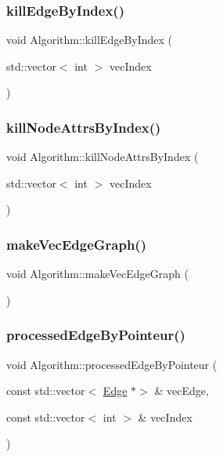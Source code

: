 \subsubsection{\texorpdfstring{kill\+Edge\+By\+Index()}{killEdgeByIndex()}}
{\footnotesize\ttfamily void Algorithm\+::kill\+Edge\+By\+Index (\begin{DoxyParamCaption}\item[{std\+::vector$<$ int $>$}]{vec\+Index }\end{DoxyParamCaption})}

\mbox{\label{struct_algorithm_a1cfa3e81c301424fcb77642926abd66e}} 
\subsubsection{\texorpdfstring{kill\+Node\+Attrs\+By\+Index()}{killNodeAttrsByIndex()}}
{\footnotesize\ttfamily void Algorithm\+::kill\+Node\+Attrs\+By\+Index (\begin{DoxyParamCaption}\item[{std\+::vector$<$ int $>$}]{vec\+Index }\end{DoxyParamCaption})}

\mbox{\label{struct_algorithm_a0baa64983c2bc5762470691ec5911910}} 
\subsubsection{\texorpdfstring{make\+Vec\+Edge\+Graph()}{makeVecEdgeGraph()}}
{\footnotesize\ttfamily void Algorithm\+::make\+Vec\+Edge\+Graph (\begin{DoxyParamCaption}{ }\end{DoxyParamCaption})}

\mbox{\label{struct_algorithm_ad92c4d7081bf7851114a5f9b76b106bf}} 
\subsubsection{\texorpdfstring{processed\+Edge\+By\+Pointeur()}{processedEdgeByPointeur()}}
{\footnotesize\ttfamily void Algorithm\+::processed\+Edge\+By\+Pointeur (\begin{DoxyParamCaption}\item[{const std\+::vector$<$ \mbox{\hyperlink{class_edge}{Edge}} $\ast$$>$ \&}]{vec\+Edge,  }\item[{const std\+::vector$<$ int $>$ \&}]{vec\+Index }\end{DoxyParamCaption})}

